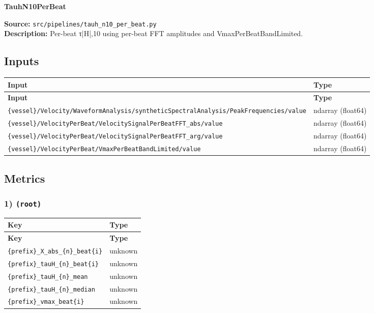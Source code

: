 \documentclass[11pt]{article}
\begin{document}
\begin{center}
\LARGE\textbf{TauhN10PerBeat}
\end{center}
\textbf{Source:} \texttt{src/\allowbreak{}pipelines/\allowbreak{}tauh\_\allowbreak{}n10\_\allowbreak{}per\_\allowbreak{}beat.py}\\
\textbf{Description:} Per-beat τ|H|,10 using per-beat FFT amplitudes and VmaxPerBeatBandLimited.

\subsection*{Inputs}
\begin{longtable}{|p{}|p{}|}
\hline
\textbf{Input} & \textbf{Type} \\ \hline
\endfirsthead
\hline
\textbf{Input} & \textbf{Type} \\ \hline
\endhead
{\footnotesize \texttt{\{vessel\}/\allowbreak{}Velocity/\allowbreak{}WaveformAnalysis/\allowbreak{}syntheticSpectralAnalysis/\allowbreak{}PeakFrequencies/\allowbreak{}value}} & ndarray (float64) \\ \hline
{\footnotesize \texttt{\{vessel\}/\allowbreak{}VelocityPerBeat/\allowbreak{}VelocitySignalPerBeatFFT\_\allowbreak{}abs/\allowbreak{}value}} & ndarray (float64) \\ \hline
{\footnotesize \texttt{\{vessel\}/\allowbreak{}VelocityPerBeat/\allowbreak{}VelocitySignalPerBeatFFT\_\allowbreak{}arg/\allowbreak{}value}} & ndarray (float64) \\ \hline
{\footnotesize \texttt{\{vessel\}/\allowbreak{}VelocityPerBeat/\allowbreak{}VmaxPerBeatBandLimited/\allowbreak{}value}} & ndarray (float64) \\ \hline
\end{longtable}

\subsection*{Metrics}
\subsubsection*{1) \texttt{(root)}}
\begin{longtable}{|p{}|p{}|}
\hline
\textbf{Key} & \textbf{Type} \\ \hline
\endfirsthead
\hline
\textbf{Key} & \textbf{Type} \\ \hline
\endhead
\texttt{\{prefix\}\_\allowbreak{}X\_\allowbreak{}abs\_\allowbreak{}\{n\}\_\allowbreak{}beat\{i\}} & unknown \\ \hline
\texttt{\{prefix\}\_\allowbreak{}tauH\_\allowbreak{}\{n\}\_\allowbreak{}beat\{i\}} & unknown \\ \hline
\texttt{\{prefix\}\_\allowbreak{}tauH\_\allowbreak{}\{n\}\_\allowbreak{}mean} & unknown \\ \hline
\texttt{\{prefix\}\_\allowbreak{}tauH\_\allowbreak{}\{n\}\_\allowbreak{}median} & unknown \\ \hline
\texttt{\{prefix\}\_\allowbreak{}vmax\_\allowbreak{}beat\{i\}} & unknown \\ \hline
\end{longtable}
\end{document}

